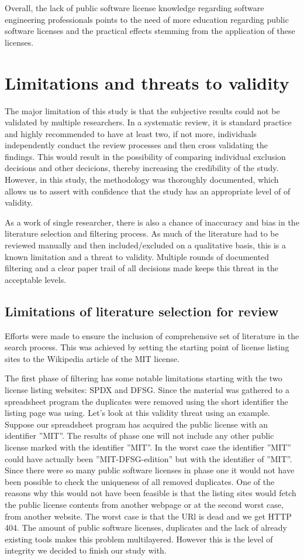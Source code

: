 Overall, the lack of public software license knowledge regarding software engineering professionals points to the need of more education regarding public software licenses and the practical effects stemming from the application of these licenses.

\section{Limitations and threats to validity}
The major limitation of this study is that the subjective results could not be validated by multiple researchers. In a systematic review, it is standard practice and highly recommended to have at least two, if not more, individuals independently conduct the review processes and then cross validating the findings. This would result in the possibility of comparing individual exclusion decisions and other decicions, thereby increasing the credibility of the study. However, in this study, the methodology was thoroughly documented, which allows us to assert with confidence that the study has an appropriate level of of validity.

As a work of single researcher, there is also a chance of inaccuracy and bias in the literature selection and filtering process. As much of the literature had to be reviewed manually and then included/excluded on a qualitative basis, this is a known limitation and a threat to validity. Multiple rounds of documented filtering and a clear paper trail of all decisions made keeps this threat in the acceptable levels.

\subsection{Limitations of literature selection for review}
Efforts were made to ensure the inclusion of comprehensive set of literature in the search process. This was achieved by setting the starting point of license listing sites to the Wikipedia article of the MIT license.

The first phase of filtering has some notable limitations starting with the two license listing websites: SPDX and DFSG. Since the material was gathered to a spreadsheet program the duplicates were removed using the short identifier the listing page was using. Let's look at this validity threat using an example. Suppose our spreadsheet program has acquired the public license with an identifier ''MIT''. The results of phase one will not include any other public license marked with the identifier ''MIT''. In the worst case the identifier ''MIT'' could have actually been ''MIT-DFSG-edition'' but with the identifier of ''MIT''. Since there were so many public software licenses in phase one it would not have been possible to check the uniqueness of all removed duplicates. One of the reasons why this would not have been feasible is that the listing sites would fetch the public license contents from another webpage or at the second worst case, from another website. The worst case is that the URl is dead and we get HTTP 404. The amount of public software licenses, duplicates and the lack of already existing tools makes this problem multilayered. However this is the level of integrity we decided to finish our study with.

